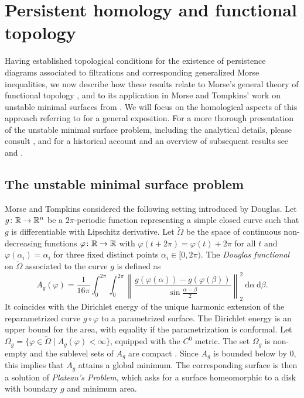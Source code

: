 
\section{Persistent homology and functional topology} \label{s:surfaces}

Having established topological conditions for the existence of persistence diagrams associated to filtrations and corresponding generalized Morse inequalities, we now describe how these results relate to Morse's general theory of functional topology \cite{Morse.1937, Morse.1938, Morse.1940}, and to its application in Morse and Tompkins' work on unstable minimal surfaces from \cite{Morse.1939}.
We will focus on the homological aspects of this approach referring to \cite[Sections 4.3--5]{Bott.1980} for a general exposition.
For a more thorough presentation of the unstable minimal surface problem, including the analytical details, please consult \cite[Section II.6]{Struwe.1988}, and for a historical account and an overview of subsequent results see \cite[Section 6]{Dierkes.2010} and \cite[Section 6.8.1]{Dierkes.2010b}.

\subsection{The unstable minimal surface problem}

Morse and Tompkins considered the following setting introduced by Douglas.
Let $g \colon \mathbb{R} \to \mathbb{R}^n$ be a $2\pi$-periodic function representing a simple closed curve such that $g$ is differentiable with Lipschitz derivative.
Let $\widetilde{\Omega}$ be the space of continuous non-decreasing functions $\varphi \colon \mathbb{R} \to \mathbb{R}$ with $\varphi(t+2\pi) = \varphi(t) + 2\pi$ for all $t$ and $\varphi(\alpha_i)=\alpha_i$ for three fixed distinct points $\alpha_i \in [0,2\pi)$.
The \emph{Douglas functional} on $\widetilde \Omega$ associated to the curve $g$ is defined as
\begin{equation*}
A_g(\varphi) = \frac{1}{16 \pi} \int_0^{2\pi} \int_0^{2\pi} \left\| \frac{g(\varphi(\alpha)) - g(\varphi(\beta))}{\sin \frac{\alpha-\beta}{2}} \right\|_2^2 \ \mathrm{d}\alpha \ \mathrm{d}\beta.
\end{equation*}
It coincides with the Dirichlet energy of the unique harmonic extension of the reparametrized curve $g \circ \varphi$ to a parametrized surface.
The Dirichlet energy is an upper bound for the area, with equality if the parametrization is conformal.
Let $\Omega_g = \{\varphi \in \widetilde\Omega \mid A_g(\varphi) < \infty\}$, equipped with the $C^0$ metric.
The set $\Omega_g$ is non-empty and the sublevel sets of $A_g$ are compact \cite[p.~448]{Morse.1939}.
Since $A_g$ is bounded below by $0$, this implies that $A_g$ attains a global minimum.
The corresponding surface is then a solution of \emph{Plateau's Problem}, which asks for a surface homeomorphic to a disk with boundary $g$ and minimum area.

